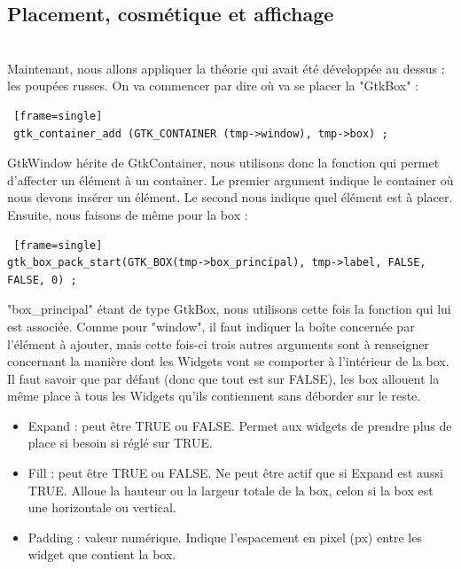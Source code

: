 \documentclass[11pt,french,a4paper]{report}
\begin{document}
\subsection{Placement, cosmétique et affichage} \\
Maintenant, nous allons appliquer la théorie qui avait été développée au dessus : les poupées russes. On va commencer par dire où 
va se placer la "GtkBox" : \\

\begin{lstlisting} [frame=single]
 gtk_container_add (GTK_CONTAINER (tmp->window), tmp->box) ; 
\end{lstlisting}

GtkWindow hérite de GtkContainer, nous utilisons donc la fonction qui permet d'affecter un élément à un container. Le premier argument 
indique le container où nous devons insérer un élément. Le second nous indique quel élément est à placer. \\

Ensuite, nous faisons de même pour la box : \\

\begin{lstlisting} [frame=single]
gtk_box_pack_start(GTK_BOX(tmp->box_principal), tmp->label, FALSE, FALSE, 0) ; 
\end{lstlisting}

"box\_principal" étant de type GtkBox, nous utilisons cette fois la fonction qui lui est associée. 
Comme pour "window", il faut indiquer la boîte concernée par l'élément à ajouter, mais cette fois-ci trois autres arguments 
sont à renseigner concernant la manière dont les Widgets vont se comporter à l'intérieur de la box. \\ 

Il faut savoir que par défaut (donc que tout est sur FALSE), les box allouent la même place à tous les Widgets qu'ils contiennent
sans déborder sur le reste.\\

\begin{itemize}
    \item Expand : peut être TRUE ou FALSE. Permet aux widgets de prendre plus de place si besoin si réglé sur TRUE. \\ 
    \item Fill : peut être TRUE ou FALSE. Ne peut être actif que si Expand est aussi TRUE. Alloue la hauteur ou la largeur totale
        de la box, 
        celon si la box est une horizontale ou vertical. \\
    \item Padding : valeur numérique. Indique l'espacement en pixel (px) entre les widget que contient la box. \\ 
\end{itemize}
\end{document}

